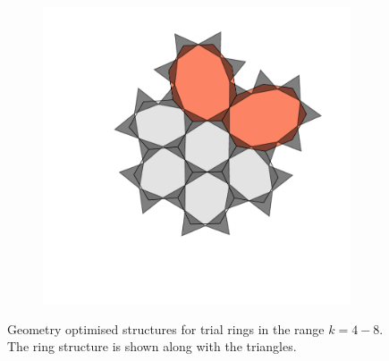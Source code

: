 \begin{figure}[bt]
\begin{subfigure}[b]{0.18\textwidth}
         \caption{}
         \label{fig:triraftalgtrial4}
     \end{subfigure}
     \hfill
      \begin{subfigure}[b]{0.18\textwidth}
         \centering
         \includegraphics[width=\textwidth]{./figures/bilayers/alg_8.pdf}
         \caption{}
         \label{fig:triraftalgtrial5}
     \end{subfigure}
     \hfill
     \caption{Geometry optimised structures for trial rings in the range $k = 4-8$. The ring structure is shown along with the \sioiii{} triangles.}
     \label{fig:triraftalgtrial}
    
\end{figure}

